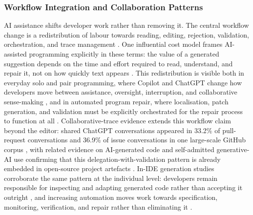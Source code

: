 \subsubsection{Workflow Integration and Collaboration Patterns}
\label{sec:hai-workflow}
AI assistance shifts developer work rather than removing it. The central workflow change is a redistribution of labour towards reading, editing, rejection, validation, orchestration, and trace management \cite{mozannar_reading_2024,stray_generative_2025,xia_agentless_2024}. One influential cost model frames AI-assisted programming explicitly in these terms: the value of a generated suggestion depends on the time and effort required to read, understand, and repair it, not on how quickly text appears \cite{mozannar_reading_2024}. This redistribution is visible both in everyday solo and pair programming, where Copilot and ChatGPT change how developers move between assistance, oversight, interruption, and collaborative sense-making \cite{stray_generative_2025}, and in automated program repair, where localisation, patch generation, and validation must be explicitly orchestrated for the repair process to function at all \cite{xia_agentless_2024}. Collaborative-trace evidence extends this workflow claim beyond the editor: shared ChatGPT conversations appeared in 33.2\% of pull-request conversations and 36.9\% of issue conversations in one large-scale GitHub corpus \cite{hao_empirical_2024}, with related evidence on AI-generated code and self-admitted generative-AI use confirming that this delegation-with-validation pattern is already embedded in open-source project artefacts \cite{grewal_analyzing_2024,tufano_developers_2026}. In-IDE generation studies corroborate the same pattern at the individual level: developers remain responsible for inspecting and adapting generated code rather than accepting it outright \cite{xu_-ide_2022}, and increasing automation moves work towards specification, monitoring, verification, and repair rather than eliminating it \cite{chen_code_2025}.

